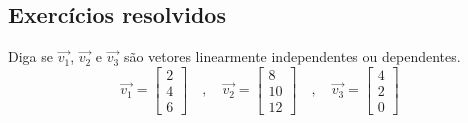 \subsection*{Exercícios resolvidos}

\construirExeresol

\begin{exeresol}
Diga se $\vec{v_1}$, $\vec{v_2}$ e $\vec{v_3}$ são vetores linearmente independentes ou dependentes.
\begin{equation}
\vec{v_1} = 
\left[
  \begin{array}{c}
  2 \\
  4 \\
  6 
  \end{array}
\right] \quad , \quad
\vec{v_2} = 
\left[
  \begin{array}{c}
  8 \\
  10 \\
  12
  \end{array}
\right] \quad , \quad
\vec{v_3} = 
\left[
  \begin{array}{c}
  4 \\
  2 \\
  0 
  \end{array}
\right]
\end{equation}
\end{exeresol}

